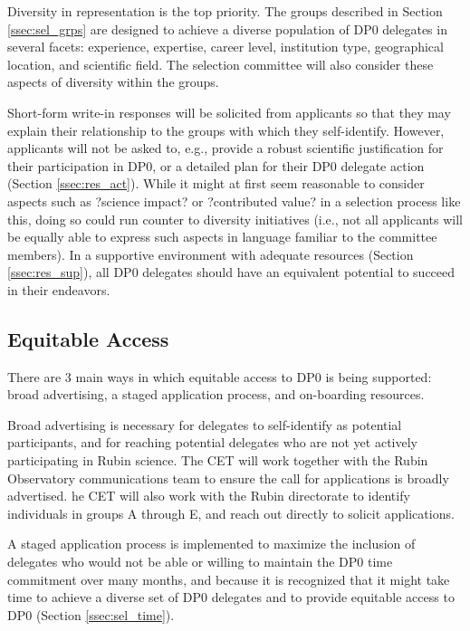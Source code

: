 \documentclass[DM,authoryear,toc]{lsstdoc}
\begin{document}
Diversity in representation is the top priority.
The groups described in Section \ref{ssec:sel_grps} are designed to achieve a diverse population of DP0 delegates in several facets: experience, expertise, career level, institution type, geographical location, and scientific field.
The selection committee will also consider these aspects of diversity within the groups.

Short-form write-in responses will be solicited from applicants so that they may explain their relationship to the groups with which they self-identify.
However, applicants will not be asked to, e.g., provide a robust scientific justification for their participation in DP0, or a detailed plan for their DP0 delegate action (Section \ref{ssec:res_act}).
While it might at first seem reasonable to consider aspects such as ?science impact? or ?contributed value? in a selection process like this, doing so could run counter to diversity initiatives (i.e., not all applicants will be equally able to express such aspects in language familiar to the committee members).
In a supportive environment with adequate resources (Section \ref{ssec:res_sup}), all DP0 delegates should have an equivalent potential to succeed in their endeavors.

\subsection{Equitable Access}\label{ssec:sel_equity}

There are 3 main ways in which equitable access to DP0 is being supported: broad advertising, a staged application process, and on-boarding resources.

Broad advertising is necessary for delegates to self-identify as potential participants, and for reaching potential delegates who are not yet actively participating in Rubin science.
The CET will work together with the Rubin Observatory communications team to ensure the call for applications is broadly advertised. 
he CET will also work with the Rubin directorate to identify individuals in groups A through E, and reach out directly to solicit applications. 

A staged application process is implemented to maximize the inclusion of delegates who would not be able or willing to maintain the DP0 time commitment over many months, and because it is recognized that it might take time to achieve a diverse set of DP0 delegates and to provide equitable access to DP0 (Section \ref{ssec:sel_time}).
\end{document}
